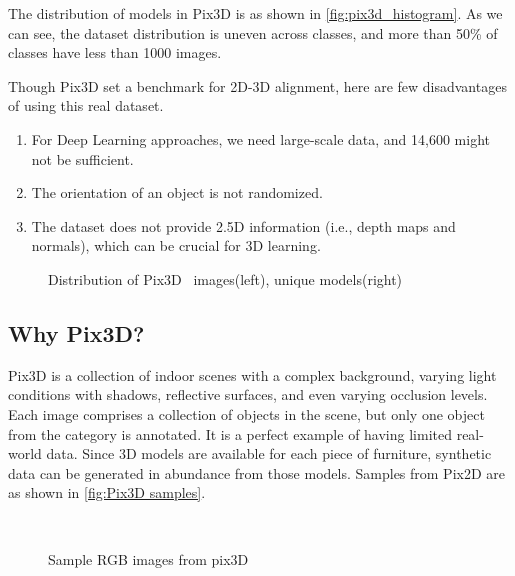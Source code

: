 The distribution of models in Pix3D is as shown in \autoref{fig:pix3d_histogram}.
As we can see, the dataset distribution is uneven across classes, and more than 50\% of classes have less than 1000 images.

Though Pix3D set a benchmark for 2D-3D alignment, here are few disadvantages of using this real dataset.
\begin{enumerate}
    \item For Deep Learning approaches, we need large-scale data, and 14,600 might not be sufficient.
    \item The orientation of an object is not randomized.
    \item The dataset does not provide 2.5D information (i.e., depth maps and normals), which can be crucial for 3D learning.
\end{enumerate}

\begin{figure}[!ht]
    \resizebox{0.49\textwidth}{6cm}{}
    \resizebox{0.49\textwidth}{6cm}{}
    \caption{Distribution of Pix3D~\cite{pix3d} images(left), unique models(right)}
    \label{fig:pix3d_histogram}
\end{figure}

\subsection{Why Pix3D?}\label{subsec:why-pix3d?}
Pix3D is a collection of indoor scenes with a complex background, varying light conditions with shadows, reflective surfaces, and even varying occlusion levels.
Each image comprises a collection of objects in the scene, but only one object from the category is annotated.
It is a perfect example of having limited real-world data.
Since 3D models are available for each piece of furniture, synthetic data can be generated in abundance from those models.
Samples from Pix2D are as shown in \autoref{fig:Pix3D samples}.

\begin{figure}[!ht]
    \centering
    \quad
    \\
    \quad
    \caption{Sample RGB images from pix3D}
    \label{fig:Pix3D samples}
\end{figure}

